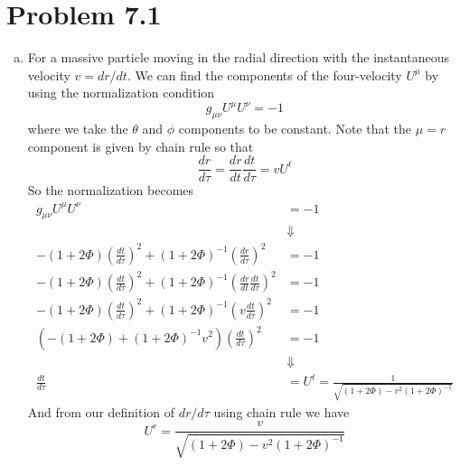 \documentclass[11pt]{article}
\numberwithin{equation}{section}
\newcommand{\HWnum}{7}
\begin{document}


\section{Problem \HWnum.1}
\begin{enumerate}[(a)]
\item
For a massive particle moving in the radial direction with the instantaneous velocity $v = dr/dt$. We can find the components of the four-velocity $U^{\mu}$ by using the normalization condition 
$$g_{\mu\nu}U^{\mu}U^{\nu} = -1$$
where we take the $\theta$ and $\phi$ components to be constant. Note that the $\mu=r$ component is given by chain rule so that
$$\frac{dr}{d\tau} = \frac{dr}{dt}\frac{dt}{d\tau} = vU^{t}$$
So the normalization becomes 
\begin{align*}
g_{\mu\nu}U^{\mu}U^{\nu} &= -1\\
&\Downarrow\\
-(1+2\Phi)\left(\frac{dt}{d\tau}\right)^2 + (1+2\Phi)^{-1}\left(\frac{dr}{d\tau}\right)^2 &= -1 \\
-(1+2\Phi)\left(\frac{dt}{d\tau}\right)^2 + (1+2\Phi)^{-1}\left(\frac{dr}{dt}\frac{dt}{d\tau}\right)^2 &= -1 \\
-(1+2\Phi)\left(\frac{dt}{d\tau}\right)^2 + (1+2\Phi)^{-1}\left(v\frac{dt}{d\tau}\right)^2 &= -1 \\
\left(-(1+2\Phi) + (1+2\Phi)^{-1}v^2\right)\left(\frac{dt}{d\tau}\right)^2 &= -1 \\
&\Downarrow\\
\frac{dt}{d\tau} &= U^{t} = \frac{1}{\sqrt{(1+2\Phi) - v^2(1+2\Phi)^{-1}}}
\end{align*}
And from our definition of $dr/d\tau$ using chain rule we have
$$U^{r} = \frac{v}{\sqrt{(1+2\Phi) - v^2(1+2\Phi)^{-1}}}$$


\end{enumerate}
\end{document}
